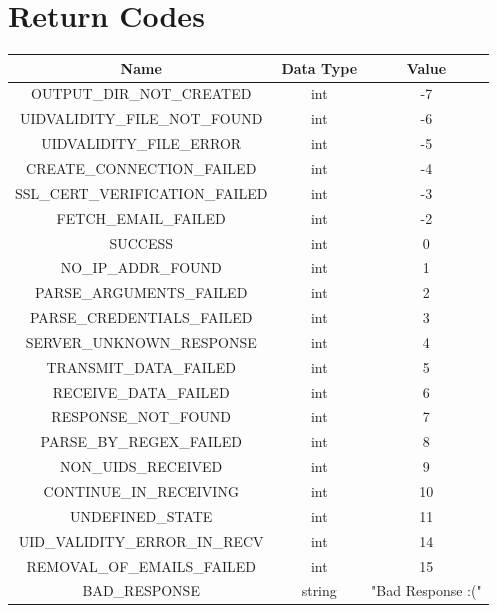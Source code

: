 \documentclass[a4paper,11pt]{article}
\begin{document}
\section{Return Codes}
\begin{center}
    \vspace{0.5cm} %
    \begin{tabular}{|c|c|c|}
        \hline
        \textbf{Name} & \textbf{Data Type} & \textbf{Value} \\
        \hline
        OUTPUT\_DIR\_NOT\_CREATED & int & -7 \\
        \hline
        UIDVALIDITY\_FILE\_NOT\_FOUND & int & -6 \\
        \hline
        UIDVALIDITY\_FILE\_ERROR & int & -5 \\
        \hline
        CREATE\_CONNECTION\_FAILED & int & -4 \\
        \hline
        SSL\_CERT\_VERIFICATION\_FAILED & int & -3 \\
        \hline
        FETCH\_EMAIL\_FAILED & int & -2 \\
        \hline
        SUCCESS & int & 0 \\
        \hline
        NO\_IP\_ADDR\_FOUND & int & 1 \\
        \hline
        PARSE\_ARGUMENTS\_FAILED & int & 2 \\
        \hline
        PARSE\_CREDENTIALS\_FAILED & int & 3 \\
        \hline
        SERVER\_UNKNOWN\_RESPONSE & int & 4 \\
        \hline
        TRANSMIT\_DATA\_FAILED & int & 5 \\
        \hline
        RECEIVE\_DATA\_FAILED & int & 6 \\
        \hline
        RESPONSE\_NOT\_FOUND & int & 7 \\
        \hline
        PARSE\_BY\_REGEX\_FAILED & int & 8 \\
        \hline
        NON\_UIDS\_RECEIVED & int & 9 \\
        \hline
        CONTINUE\_IN\_RECEIVING & int & 10 \\
        \hline
        UNDEFINED\_STATE & int & 11 \\
        \hline
        UID\_VALIDITY\_ERROR\_IN\_RECV & int & 14 \\
        \hline
        REMOVAL\_OF\_EMAILS\_FAILED & int & 15 \\
        \hline
        BAD\_RESPONSE & string & "Bad Response :(" \\
        \hline
    \end{tabular}
    \vspace{0.5cm} %
\end{center}



      
\end{document}
